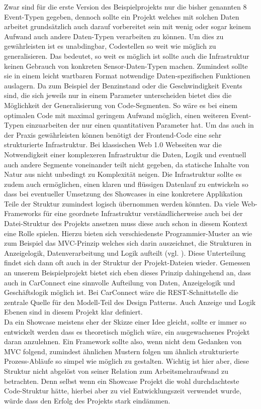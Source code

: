 \documentclass[12pt,a4paper,oneside, 
liststotoc, 					%
bibtotoc,						%
titlepage, 						%
headsepline, 					%
BCOR6mm,						%
openany,							%
]{scrreprt}
\begin{document}
Zwar sind für die erste Version des Beispielprojekts nur die bisher genannten 8 Event-Typen gegeben, dennoch sollte ein Projekt welches mit solchen Daten arbeitet grundsätzlich auch darauf vorbereitet sein mit wenig oder sogar keinem Aufwand auch andere Daten-Typen verarbeiten zu können. Um dies zu gewährleisten ist es unabdingbar, Codestellen so weit wie möglich zu generalisieren. Das bedeutet, so weit es möglich ist sollte auch die Infrastruktur keinen Gebrauch von konkreten Sensor-Daten-Typen machen. Zumindest sollte sie in einem leicht wartbaren Format notwendige Daten-spezifischen Funktionen auslagern. Da zum Beispiel der Benzinstand oder die Geschwindigkeit Events sind, die sich jeweils nur in einem Parameter unterscheiden bietet dies die Möglichkeit der Generalisierung von Code-Segmenten. So wäre es bei einem optimalen Code mit maximal geringem Aufwand möglich, einen weiteren Event-Typen einzuarbeiten der nur einen quantitativen Parameter hat. Um das auch in der Praxis gewährleisten können benötigt der Frontend-Code eine sehr strukturierte Infrastruktur. Bei klassischen Web 1.0 Webseiten war die Notwendigkeit einer komplexeren Infrastruktur die Daten, Logik und eventuell auch andere Segmente voneinander teilt nicht gegeben, da statische Inhalte von Natur aus nicht unbedingt zu Komplexität neigen. Die Infrastruktur sollte es zudem auch ermöglichen, einen klaren und flüssigen Datenlauf zu entwickeln so dass bei eventueller Umsetzung des Showcases in eine konkretere Applikation Teile der Struktur zumindest logisch übernommen werden könnten.
Da viele Web-Frameworks für eine geordnete Infrastruktur verständlicherweise auch bei der Datei-Struktur des Projekts ansetzen muss diese auch schon in diesem Kontext eine Rolle spielen.
Hierzu bieten sich verschiedenste Programmier-Muster an wie zum Beispiel das MVC-Prinzip welches sich darin auszeichnet, die Strukturen in Anzeigelogik, Datenverarbeitung und Logik aufteilt (vgl. \cite{mvc}). Diese Unterteilung findet sich dann oft auch in der Struktur der Projekt-Dateien wieder. Gemessen an unserem Beispielprojekt bietet sich eben dieses Prinzip dahingehend an, dass auch in CarConnect eine sinnvolle Aufteilung von Daten, Anzeigelogik und Geschäftslogik möglich ist. Bei CarConnect wäre die REST-Schnittstelle die zentrale Quelle für den Modell-Teil des Design Patterns. Auch Anzeige und Logik Ebenen sind in diesem Projekt klar definiert. \\
Da ein Showcase meistens eher der Skizze einer Idee gleicht, sollte er immer so entwickelt werden dass es theoretisch möglich wäre, ein ausgewachsenes Projekt daran anzulehnen. Ein Framework sollte also, wenn nicht dem Gedanken von MVC folgend, zumindest ähnlichen Mustern folgen um ähnlich strukturierte Prozess-Abläufe so simpel wie möglich zu gestalten. Wichtig ist hier aber, diese Struktur nicht abgelöst von seiner Relation zum Arbeitsmehraufwand zu betrachten. Denn selbst wenn ein Showcase Projekt die wohl durchdachteste Code-Struktur hätte, hierbei aber zu viel Entwicklungszeit verwendet wurde, würde dass den Erfolg des Projekts stark eindämmen.
\end{document}
